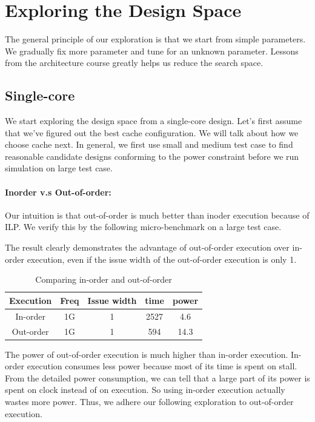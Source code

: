 \documentclass[twocolumn,letterpaper,10pt]{article}
\begin{document}
\section{Exploring the Design Space}
\label{sec:design}

The general principle of our exploration is that we start from simple
parameters. We gradually fix more parameter and tune for an unknown parameter. Lessons from the
architecture course greatly helps us reduce the search space.

\subsection{Single-core}
We start exploring the design space from a single-core design. Let's
first assume that we've figured out the best cache configuration. We
will talk about how we choose cache next. In general, we first use
small and medium test case to find reasonable candidate designs
conforming to the power constraint before we run simulation on large test case.

\paragraph{Inorder v.s Out-of-order:} Our intuition is that
out-of-order is much better than inoder execution because of ILP. We
verify this by the following micro-benchmark on a large test case.

The result clearly demonstrates the advantage of out-of-order
execution over in-order execution, even if the issue width of the
out-of-order execution is only 1.

\begin{table}[ht!]
\begin{center}
\begin{tabular}{ccccc}
\toprule
Execution   &  Freq  & Issue width  &  time  & power \\
\midrule
In-order   &  1G  &  1  &  2527  &  4.6 \\
Out-order     &  1G &  1  &    594 & 14.3 \\
\bottomrule
\end{tabular}
\end{center}
\caption{Comparing in-order and out-of-order}
\end{table}

The power of out-of-order execution is much higher than in-order execution. In-order execution
consumes less power because most of its time is spent on stall. From
the detailed power consumption, we can tell that a
large part of its power is spent on clock instead of on execution. So using in-order execution
actually wastes more power. Thus, we adhere our following exploration to out-of-order execution.
\end{document}
